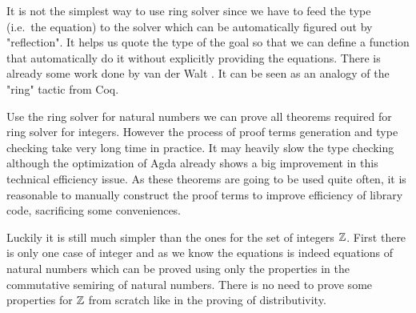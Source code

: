 It is not the simplest way to use ring solver since we have to feed
the type (i.e.\ the equation) to the solver which can be automatically
figured out by "reflection". It helps us quote the type of the goal so
that we can define a function that automatically do it without
explicitly providing the equations. There is already some work
done by van der Walt \cite{van2012reflection}. It can be seen as an
analogy of the "ring" tactic from Coq.


Use the ring solver for natural numbers we can prove all theorems
required for ring solver for integers. However the process of proof
terms generation and type checking take very long time in practice. It may heavily slow the type
checking although the optimization of Agda already shows a big
improvement in this technical efficiency issue. As
these theorems are going to be used quite often, it is reasonable to
manually construct the proof terms to improve efficiency of library
code, sacrificing some conveniences.

Luckily it is still much simpler than the ones for the set of integers $\mathbb{Z}$.
First there is only one case of integer and as we know the equations is
indeed equations of natural numbers which can be proved using only the
properties in the commutative semiring of natural numbers. There is no
need to prove some properties for $\mathbb{Z}$ from scratch like in the
proving of distributivity.

